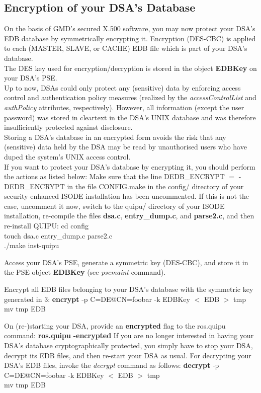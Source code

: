 \subsection{Encryption of your DSA's Database}
\label{encryptedb}
On the basis of GMD's secured X.500 software, you may now protect your DSA's EDB database
by symmetrically encrypting it. Encryption (DES-CBC) is applied to each (MASTER, SLAVE, or
CACHE) EDB file which is part of your DSA's database.
\\ [1em]
The DES key used for encryption/decryption is stored in the object {\bf EDBKey} on your DSA's PSE.
\\ [1em]
Up to now, DSAs could only protect any (sensitive) data by enforcing access control
and authentication policy measures (realized by the {\em accessControlList} and {\em authPolicy} 
attributes, respectively).
However, all information (except the user password) was stored in cleartext in the DSA's 
UNIX database and was therefore insufficiently protected against disclosure.
\\ [1em]
Storing a DSA's database in an encrypted form avoids the risk that any (sensitive) data
held by the DSA may be read by unauthorised users who have duped the system's 
UNIX access control.
\\ [1em]
If you want to protect your DSA's database by encrypting it, you should perform the
actions as listed below:
\be
\m Make sure that the line
\bvtab
\1 DEDB\_ENCRYPT $=$ -DEDB\_ENCRYPT
\evtab
in the file CONFIG.make in the config/ directory of your security-enhanced ISODE installation
has been uncommented. If this is not the case, uncomment it now, switch to the quipu/ directory 
of your ISODE installation, re-compile the files
{\bf dsa.c}, {\bf entry\_dump.c}, and {\bf parse2.c}, and then re-install QUIPU:
\bvtab
\1 cd config \\
\1 touch dsa.c entry\_dump.c parse2.c \\
\1 ./make inst-quipu
\evtab

\m Access your DSA's PSE, generate a symmetric key (DES-CBC), and store it in the
PSE object {\bf EDBKey} (see {\em psemaint} command).

\m Encrypt all EDB files belonging to your DSA's database with the symmetric key
generated in 3:
\bvtab
\1 {\bf encrypt} -p C=DE@CN=foobar -k EDBKey $<$ EDB $>$ tmp \\
\1 mv tmp EDB
\evtab

\m On (re-)starting your DSA, provide an {\bf encrypted} flag to the ros.quipu command:
\bvtab
\1 {\bf ros.quipu} {\bf -encrypted}
\evtab
\ee
If you are no longer interested in having your DSA's database cryptographically protected,
you simply have to stop your DSA, decrypt its EDB files, and then re-start your DSA as usual.
For decrypting your DSA's EDB files, invoke the {\em decrypt} command as follows:
\bvtab
\1 {\bf decrypt} -p C=DE@CN=foobar -k EDBKey $<$ EDB $>$ tmp \\
\1 mv tmp EDB
\evtab


